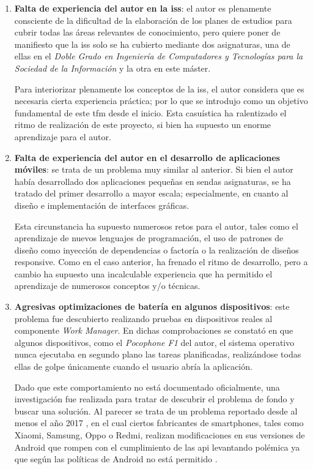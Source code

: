     \begin{enumerate}
        \item \textbf{Falta de experiencia del autor en la \gls{iss}}: el autor es plenamente consciente de la dificultad de la elaboración de los planes de estudios para cubrir todas las áreas relevantes de conocimiento, pero quiere poner de manifiesto que la \gls{iss} solo se ha cubierto mediante dos asignaturas, una de ellas en el \textit{Doble Grado en Ingeniería de Computadores y Tecnologías para la Sociedad de la Información} y la otra en este máster.
        
        Para interiorizar plenamente los conceptos de la \gls{iss}, el autor considera que es necesaria cierta experiencia práctica; por lo que se introdujo como un objetivo fundamental de este \gls{tfm} desde el inicio. Esta casuística ha ralentizado el ritmo de realización de este proyecto, si bien ha supuesto un enorme aprendizaje para el autor.
        
        \item \textbf{Falta de experiencia del autor en el desarrollo de aplicaciones móviles}: se trata de un problema muy similar al anterior. Si bien el autor había desarrollado dos aplicaciones pequeñas en sendas asignaturas, se ha tratado del primer desarrollo a mayor escala; especialmente, en cuanto al diseño e implementación de interfaces gráficas.
    
        Esta circunstancia ha supuesto numerosos retos para el autor, tales como el aprendizaje de nuevos lenguajes de programación, el uso de patrones de diseño como inyección de dependencias o factoría o la realización de diseños \gls{responsive}. Como en el caso anterior, ha frenado el ritmo de desarrollo, pero a cambio ha supuesto una incalculable experiencia que ha permitido el aprendizaje de numerosos conceptos y/o técnicas.
    
        \item \label{resultados:problemas:planificador} \textbf{Agresivas optimizaciones de batería en algunos dispositivos}: este problema fue descubierto realizando pruebas en dispositivos reales al componente \textit{Work Manager}. En dichas comprobaciones se constató en que algunos dispositivos, como el \textit{Pocophone F1} del autor, el sistema operativo nunca ejecutaba en segundo plano las tareas planificadas, realizándose todas ellas de golpe únicamente cuando el usuario abría la aplicación.
    
        Dado que este comportamiento no está documentado oficialmente, una investigación fue realizada para tratar de descubrir el problema de fondo y buscar una solución. Al parecer se trata de un problema reportado desde al menos el año 2017 \cite{mathew_why_2017}, en el cual ciertos fabricantes de \glspl{smartphone}, tales como Xiaomi, Samsung, Oppo o Redmi, realizan modificaciones en sus versiones de Android que rompen con el cumplimiento de las \gls{api} \cite{android_public_tracker_chinese_nodate} \cite{android_public_tracker_request_nodate}
        levantando polémica ya que según las políticas de Android no está permitido \cite{cylon999_workmanager_2018}.
    

\end{enumerate}
